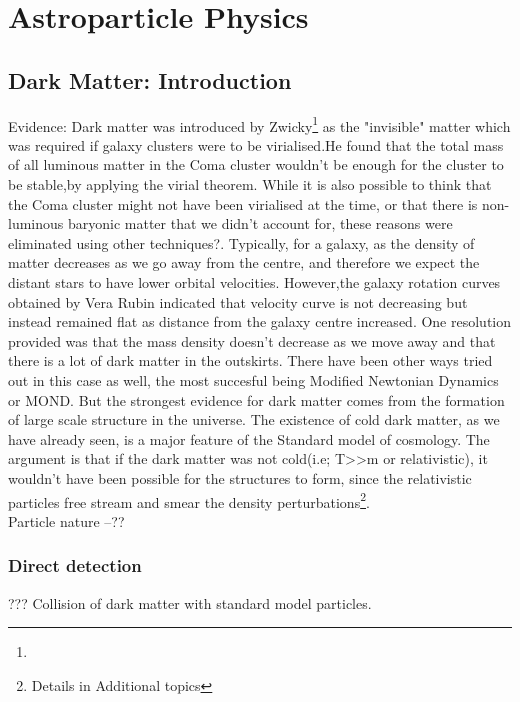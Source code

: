 \documentclass[12pt,a4paper,oneside]{book}
\begin{document}
\chapter{Astroparticle Physics}
\section{Dark Matter: Introduction}
 Evidence: Dark matter was introduced by Zwicky\footnote{} as the "invisible" matter which was required if galaxy clusters were to be virialised.He found that the total mass of all luminous matter in the Coma cluster wouldn't be enough for the cluster to be stable,by applying the virial theorem. While it is also possible to think that the Coma cluster might not have been virialised at the time, or that there is non-luminous baryonic matter that we didn't account for, these reasons were eliminated using other techniques?. Typically, for a galaxy, as the density of matter decreases as we go away from the centre, and therefore we expect the distant stars to have lower orbital velocities. However,the galaxy rotation curves obtained by Vera Rubin indicated that velocity curve is not decreasing but instead remained flat as distance from the galaxy centre increased. One resolution provided was that the mass density doesn't decrease as we move away and that there is a lot of dark matter in the outskirts. There have been other ways tried out in this case as well, the most succesful being Modified Newtonian Dynamics or MOND. But the strongest evidence for dark matter comes from the formation of large scale structure in the universe. The existence of cold dark matter, as we have already seen, is a major feature of the Standard model of cosmology. The argument is that if the dark matter was not cold(i.e; T>>m or relativistic), it wouldn't have been possible for the structures to form, since the relativistic particles free stream and smear the density perturbations\footnote{Details in Additional topics}.
\\ Particle nature --?? 

\subsection{Direct detection}
???
Collision of dark matter with standard model particles.
\end{document}
